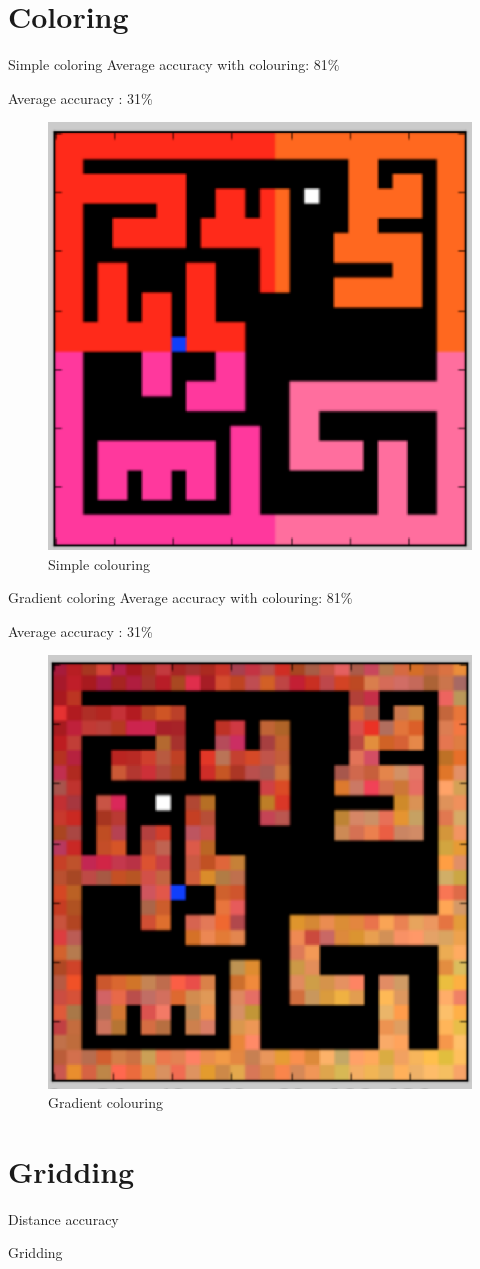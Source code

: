\documentclass{beamer}
\begin{document}
\section{Coloring}
\begin{frame}{Simple coloring}
Average accuracy with colouring: 81\%

Average accuracy : 31\%
\begin{figure}
        \includegraphics[width=0.35\linewidth]{simple.png}
        \caption{Simple colouring}
    \label{fig1}
\end{figure}
\end{frame}

\begin{frame}{Gradient coloring}
Average accuracy with colouring: 81\%

Average accuracy : 31\%
\begin{figure}
        \includegraphics[width=0.35\linewidth]{gradient.png}
        \caption{Gradient colouring}
    \label{fig2}
\end{figure}
\end{frame}

\section{Gridding}
\begin{frame}{Distance accuracy}
\end{frame}

\begin{frame}{Gridding}
\end{frame}
\end{document}
